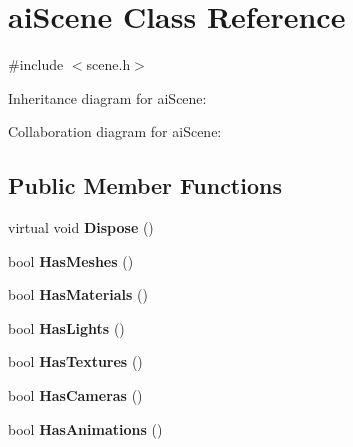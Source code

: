 \hypertarget{structai_scene}{\section{ai\+Scene Class Reference}
\label{structai_scene}
}


{\ttfamily \#include $<$scene.\+h$>$}



Inheritance diagram for ai\+Scene\+:


Collaboration diagram for ai\+Scene\+:
\subsection*{Public Member Functions}
\begin{DoxyCompactItemize}
\item 
\hypertarget{structai_scene_a6914111c31f1fa8b3a31f981f135937f}{virtual void {\bfseries Dispose} ()}\label{structai_scene_a6914111c31f1fa8b3a31f981f135937f}

\item 
\hypertarget{structai_scene_aaada8d49bc362f60666cc19f28d9e0cb}{bool {\bfseries Has\+Meshes} ()}\label{structai_scene_aaada8d49bc362f60666cc19f28d9e0cb}

\item 
\hypertarget{structai_scene_a488681f55aa65dbce733df7f71e8c8ca}{bool {\bfseries Has\+Materials} ()}\label{structai_scene_a488681f55aa65dbce733df7f71e8c8ca}

\item 
\hypertarget{structai_scene_a63b081f903cc7a86bd966078e79ddf31}{bool {\bfseries Has\+Lights} ()}\label{structai_scene_a63b081f903cc7a86bd966078e79ddf31}

\item 
\hypertarget{structai_scene_afd00d9da32b003b14c2b482562e070b6}{bool {\bfseries Has\+Textures} ()}\label{structai_scene_afd00d9da32b003b14c2b482562e070b6}

\item 
\hypertarget{structai_scene_ab77f56ce66b2221ad139505859e99858}{bool {\bfseries Has\+Cameras} ()}\label{structai_scene_ab77f56ce66b2221ad139505859e99858}

\item 
\hypertarget{structai_scene_a2896dd2f1585eee78c18da19716dc924}{bool {\bfseries Has\+Animations} ()}\label{structai_scene_a2896dd2f1585eee78c18da19716dc924}

\end{DoxyCompactItemize}
